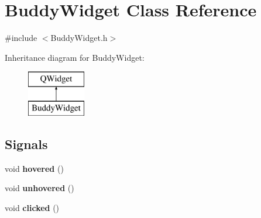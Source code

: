 \hypertarget{class_buddy_widget}{}\section{Buddy\+Widget Class Reference}
\label{class_buddy_widget}


{\ttfamily \#include $<$Buddy\+Widget.\+h$>$}

Inheritance diagram for Buddy\+Widget\+:\begin{figure}[H]
\begin{center}
\leavevmode
\includegraphics[height=2.000000cm]{class_buddy_widget}
\end{center}
\end{figure}
\subsection*{Signals}
\begin{DoxyCompactItemize}
\item 
\hypertarget{class_buddy_widget_a7ab167f06ebc6aad64599c1c8ceb810a}{}void {\bfseries hovered} ()\label{class_buddy_widget_a7ab167f06ebc6aad64599c1c8ceb810a}

\item 
\hypertarget{class_buddy_widget_a9a13384faca554b417c50fcdaa9c438f}{}void {\bfseries unhovered} ()\label{class_buddy_widget_a9a13384faca554b417c50fcdaa9c438f}

\item 
\hypertarget{class_buddy_widget_a96c77c847ce1e03786f5ba15d4653e05}{}void {\bfseries clicked} ()\label{class_buddy_widget_a96c77c847ce1e03786f5ba15d4653e05}

\end{DoxyCompactItemize}
